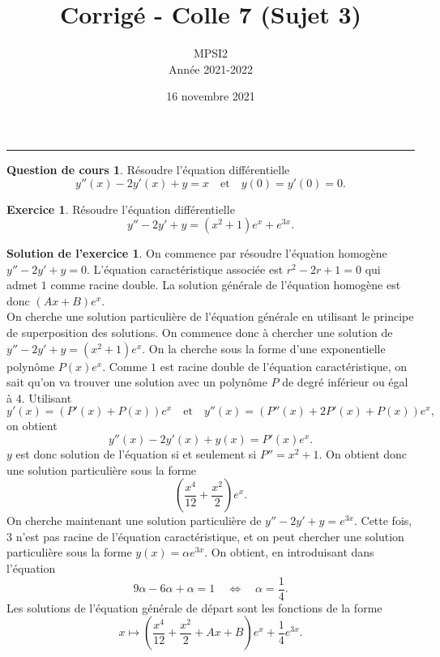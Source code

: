 \documentclass[a4paper, 11pt,openany]{article}%
\title{Corrigé - Colle 7 (Sujet 3)}
\author{MPSI2\\
Année 2021-2022}
\date{16 novembre 2021}
\theoremstyle{plain}
\theoremstyle{definition}
\newtheorem{cours}{Question de cours}
\newtheorem{exo}{Exercice}
\newtheorem{sol}{Solution de l'exercice}
\theoremstyle{remark}
\begin{document}
   \maketitle
      \rule{\linewidth}{0.5mm}

\begin{cours}
Résoudre l'équation différentielle
\[ y''(x) - 2y'(x) + y = x \quad \text{et} \quad y(0) = y'(0) = 0.\]
\end{cours}


\begin{exo}
Résoudre l'équation différentielle
\[ y''-2y' + y = (x^2 + 1)e^x + e^{3x}.\]
\end{exo}


\begin{sol}
On commence par résoudre l'équation homogène $y''-2y'+y=0$. L'équation caractéristique associée est $r^2-2r+1=0$ qui admet $1$ comme racine double. La solution générale de l'équation homogène est donc $(Ax+B)e^x$.\\
On cherche une solution particulière de l'équation générale en utilisant le principe de superposition des solutions. On commence donc à chercher une solution de $y''-2y'+y=(x^2+1)e^x$. On la cherche sous la forme d'une exponentielle polynôme $P(x)e^x$. Comme $1$ est racine double de l'équation caractéristique, on sait qu'on va trouver une solution avec un polynôme $P$ de degré inférieur ou égal à $4$. Utilisant 
\[ y'(x)=(P'(x)+P(x))e^x \quad \text{et} \quad y''(x)=(P''(x)+2P'(x)+P(x))e^x,\]
on obtient 
\[ y''(x)-2y'(x)+y(x)=P'(x)e^x.\]
$y$ est donc solution de l'équation si et seulement si $P''=x^2+1$. On obtient donc une solution particulière sous la forme \[ \left( \frac{x^4}{12}+\frac{x^2}{2} \right)e^x.\]
On cherche maintenant une solution particulière de $y''-2y'+y=e^{3x}$. Cette fois, 3 n'est pas racine de l'équation caractéristique, et on peut chercher une solution particulière sous la forme $y(x)= \alpha e^{3x}$. On obtient, en introduisant dans l'équation \[ 9\alpha - 6 \alpha + \alpha =1 \quad \Leftrightarrow \quad \alpha= \frac{1}{4}.\]
Les solutions de l'équation générale de départ sont les fonctions de la forme \[ x \mapsto \left( \frac{x^4}{12}+\frac{x^2}{2} + Ax + B \right)e^x + \frac{1}{4} e^{3x}.\]
\end{sol}
\end{document}
